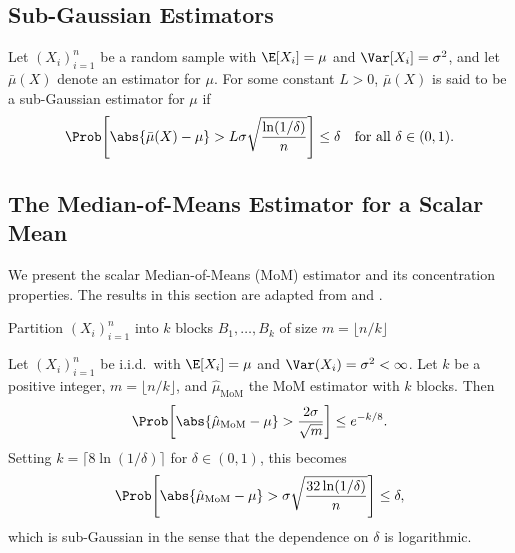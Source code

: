 \subsection{Sub-Gaussian Estimators}
\begin{definition}
Let $(X_i)_{i=1}^{n}$ be a random sample with $\E[X_i] = \mu$ and $\Var[X_i] = \sigma^2$, and let $\bar{\mu}(X)$ denote an estimator for $\mu$. For some constant $L > 0$, $\bar{\mu}(X)$ is said to be a sub-Gaussian estimator for $\mu$ if 
\begin{equation}
\label{eq:subgaussian}
    \Prob\!\left[\abs{\bar{\mu}(X) - \mu} > L\sigma \sqrt{\frac{\ln(1/\delta)}{n}}\right] \leq \delta \quad \text{for all } \delta \in (0,1).
\end{equation}
\end{definition}


\subsection{The Median-of-Means Estimator for a Scalar Mean}
\label{sec:mom_prelim}
We present the scalar Median-of-Means (MoM) estimator and its concentration properties. The results in this section are adapted from \cite{devroye2016sub} and \cite{lugosi2019mean}.

\begin{algorithm}[H]
\label{alg:mom}
\caption{Scalar Median-of-Means Estimator}

Partition $(X_i)_{i=1}^{n}$ into $k$ blocks $B_1, \dots, B_k$ of size $m = \lfloor n/k \rfloor$\;


\;
\end{algorithm}

\begin{theorem}
\label{thm:mom_scalar}
Let $(X_i)_{i=1}^{n}$ be i.i.d.\ with $\E[X_i] = \mu$ and $\Var(X_i) = \sigma^2 < \infty$. Let $k$ be a positive integer, $m = \lfloor n/k \rfloor$, and $\hat{\mu}_{\mathrm{MoM}}$ the MoM estimator with $k$ blocks. Then
\begin{equation}
\label{eq:mom_conc}
    \Prob\!\left[\abs{\hat{\mu}_{\mathrm{MoM}} - \mu} > \frac{2\sigma}{\sqrt{m}}\right] \leq e^{-k/8}.
\end{equation}
Setting $k = \lceil 8\ln(1/\delta) \rceil$ for $\delta \in (0,1)$, this becomes
\begin{equation}
\label{eq:mom_subgauss}
    \Prob\!\left[\abs{\hat{\mu}_{\mathrm{MoM}} - \mu} > \sigma\sqrt{\frac{32\ln(1/\delta)}{n}}\right] \leq \delta,
\end{equation}
which is sub-Gaussian in the sense that the dependence on $\delta$ is logarithmic.
\end{theorem}

